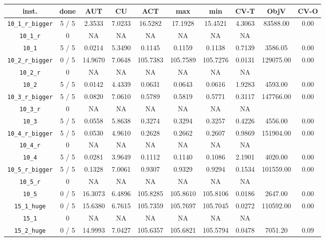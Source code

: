\documentclass{scrartcl}
\begin{document}
\begin{table}[h!]
\begin{center}
\small
\begin{tabular}{| c | c | c | c | c | c | c | c | c | c |}
\hline
inst. & done & AUT & CU & ACT & max & min & CV-T & ObjV & CV-O \\
\hline
\verb|10_1_r_bigger| & 5 / 5 & 2.3533 & 7.0233 & 16.5282 & 17.1928 & 15.4521 & 4.3063 & 83588.00 & 0.00\\ 
\verb|10_1_r| & 0 & NA & NA & NA & NA & NA & NA & \\ 
\verb|10_1| & 5 / 5 & 0.0214 & 5.3490 & 0.1145 & 0.1159 & 0.1138 & 0.7139 & 3586.05 & 0.00\\ 
\verb|10_2_r_bigger| & 0 / 5 & 14.9670 & 7.0648 & 105.7383 & 105.7589 & 105.7276 & 0.0131 & 129075.00 & 0.00\\ 
\verb|10_2_r| & 0 & NA & NA & NA & NA & NA & NA & \\ 
\verb|10_2| & 5 / 5 & 0.0142 & 4.4339 & 0.0631 & 0.0643 & 0.0616 & 1.9283 & 4593.00 & 0.00\\ 
\verb|10_3_r_bigger| & 5 / 5 & 0.0820 & 7.0610 & 0.5789 & 0.5819 & 0.5771 & 0.3117 & 147766.00 & 0.00\\ 
\verb|10_3_r| & 0 & NA & NA & NA & NA & NA & NA & \\ 
\verb|10_3| & 5 / 5 & 0.0558 & 5.8638 & 0.3274 & 0.3294 & 0.3257 & 0.4226 & 4556.00 & 0.00\\ 
\verb|10_4_r_bigger| & 5 / 5 & 0.0530 & 4.9610 & 0.2628 & 0.2662 & 0.2607 & 0.9869 & 151904.00 & 0.00\\ 
\verb|10_4_r| & 0 & NA & NA & NA & NA & NA & NA & \\ 
\verb|10_4| & 5 / 5 & 0.0281 & 3.9649 & 0.1112 & 0.1140 & 0.1086 & 2.1901 & 4020.00 & 0.00\\ 
\verb|10_5_r_bigger| & 5 / 5 & 0.1328 & 7.0061 & 0.9307 & 0.9329 & 0.9294 & 0.1534 & 101559.00 & 0.00\\ 
\verb|10_5_r| & 0 & NA & NA & NA & NA & NA & NA & \\ 
\verb|10_5| & 0 / 5 & 16.3073 & 6.4896 & 105.8285 & 105.8610 & 105.8106 & 0.0186 & 2647.00 & 0.00\\ 
\verb|15_1_huge| & 0 / 5 & 15.6380 & 6.7615 & 105.7359 & 105.7697 & 105.7045 & 0.0272 & 110592.00 & 0.00\\ 
\verb|15_1| & 0 & NA & NA & NA & NA & NA & NA & \\ 
\verb|15_2_huge| & 0 / 5 & 14.9993 & 7.0427 & 105.6357 & 105.6821 & 105.5794 & 0.0478 & 7051.20 & 0.09\\ 

\end{tabular}
\end{center}
\end{table}
\end{document}
